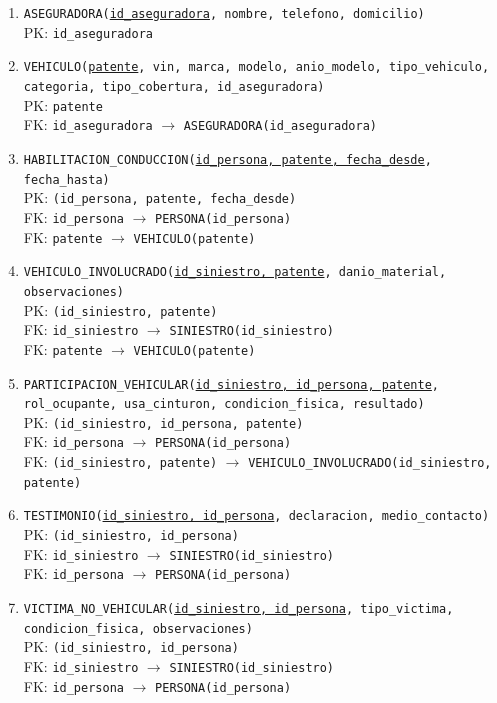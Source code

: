 \documentclass[12pt,a4paper]{article}
\begin{document}
\begin{enumerate}[leftmargin=*]
    \item \texttt{ASEGURADORA(\underline{id\_aseguradora}, nombre, telefono, domicilio)}\\
    PK: \texttt{id\_aseguradora}

    \item \texttt{VEHICULO(\underline{patente}, vin, marca, modelo, anio\_modelo, tipo\_vehiculo, categoria, tipo\_cobertura, id\_aseguradora)}\\
    PK: \texttt{patente}\\
    FK: \texttt{id\_aseguradora} $\rightarrow$ \texttt{ASEGURADORA(id\_aseguradora)}

    \item \texttt{HABILITACION\_CONDUCCION(\underline{id\_persona, patente, fecha\_desde}, fecha\_hasta)}\\
    PK: \texttt{(id\_persona, patente, fecha\_desde)}\\
    FK: \texttt{id\_persona} $\rightarrow$ \texttt{PERSONA(id\_persona)}\\
    FK: \texttt{patente} $\rightarrow$ \texttt{VEHICULO(patente)}

    \item \texttt{VEHICULO\_INVOLUCRADO(\underline{id\_siniestro, patente}, danio\_material, observaciones)}\\
    PK: \texttt{(id\_siniestro, patente)}\\
    FK: \texttt{id\_siniestro} $\rightarrow$ \texttt{SINIESTRO(id\_siniestro)}\\
    FK: \texttt{patente} $\rightarrow$ \texttt{VEHICULO(patente)}

    \item \texttt{PARTICIPACION\_VEHICULAR(\underline{id\_siniestro, id\_persona, patente}, rol\_ocupante, usa\_cinturon, condicion\_fisica, resultado)}\\
    PK: \texttt{(id\_siniestro, id\_persona, patente)}\\
    FK: \texttt{id\_persona} $\rightarrow$ \texttt{PERSONA(id\_persona)}\\
    FK: \texttt{(id\_siniestro, patente)} $\rightarrow$ \texttt{VEHICULO\_INVOLUCRADO(id\_siniestro, patente)}

    \item \texttt{TESTIMONIO(\underline{id\_siniestro, id\_persona}, declaracion, medio\_contacto)}\\
    PK: \texttt{(id\_siniestro, id\_persona)}\\
    FK: \texttt{id\_siniestro} $\rightarrow$ \texttt{SINIESTRO(id\_siniestro)}\\
    FK: \texttt{id\_persona} $\rightarrow$ \texttt{PERSONA(id\_persona)}

    \item \texttt{VICTIMA\_NO\_VEHICULAR(\underline{id\_siniestro, id\_persona}, tipo\_victima, condicion\_fisica, observaciones)}\\
    PK: \texttt{(id\_siniestro, id\_persona)}\\
    FK: \texttt{id\_siniestro} $\rightarrow$ \texttt{SINIESTRO(id\_siniestro)}\\
    FK: \texttt{id\_persona} $\rightarrow$ \texttt{PERSONA(id\_persona)}
\end{enumerate}
\end{document}
